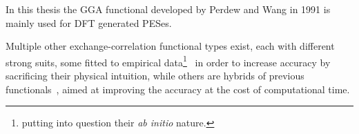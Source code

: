 In this thesis the GGA functional developed by Perdew and Wang in 1991 is mainly used for DFT generated PESes.~\cite{pw91}

Multiple other exchange-correlation functional types exist, each with different strong suits, some fitted to empirical data\footnote{putting into question their \textit{ab initio} nature.}~\cite{blyp-1993} in order to increase accuracy by sacrificing their physical intuition, while others are hybrids of previous functionals~\cite{xc-review-1999, jacobs-ladder-2001, meta-gga-2003, exact-exchange-1996}, aimed at improving the accuracy at the cost of computational time.
